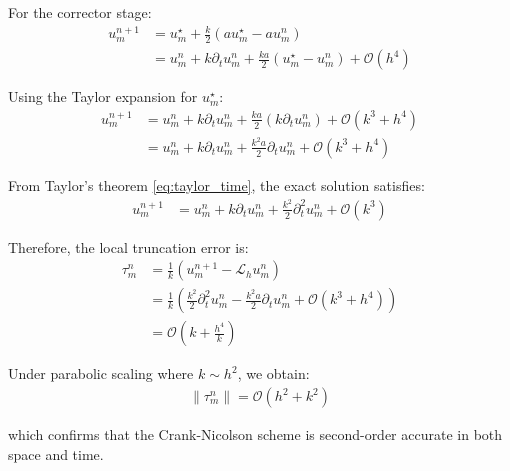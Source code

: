 For the corrector stage:
\begin{align}
  u_m^{n+1} & = u_m^\star + \frac{k}{2}(au_m^\star - au_m^n)                                    \\
            & = u_m^n + k \partial_t u_m^n + \frac{ka}{2}(u_m^\star - u_m^n) + \mathcal{O}(h^4)
\end{align}

Using the Taylor expansion for $u_m^\star$:
\begin{align}
  u_m^{n+1} & = u_m^n + k \partial_t u_m^n + \frac{ka}{2}(k \partial_t u_m^n) + \mathcal{O}(k^3 + h^4) \\
            & = u_m^n + k \partial_t u_m^n + \frac{k^2a}{2} \partial_t u_m^n + \mathcal{O}(k^3 + h^4)
\end{align}

From Taylor's theorem \eqref{eq:taylor_time}, the exact solution satisfies:
\begin{align}
  u_m^{n+1} & = u_m^n + k \partial_t u_m^n + \frac{k^2}{2}\partial_t^2 u_m^n + \mathcal{O}(k^3)
\end{align}

Therefore, the local truncation error is:
\begin{align}
  \tau_m^n & = \frac{1}{k}\left(u_m^{n+1} - \mathcal{L}_h u_m^n\right)                                                           \\
           & = \frac{1}{k}\left(\frac{k^2}{2}\partial_t^2 u_m^n - \frac{k^2a}{2}\partial_t u_m^n + \mathcal{O}(k^3 + h^4)\right) \\
           & = \mathcal{O}\left(k + \frac{h^4}{k}\right)
\end{align}

Under parabolic scaling where $k \sim h^2$, we obtain:
\begin{align}
  \|\tau_m^n\| = \mathcal{O}(h^2 + k^2)
\end{align}

which confirms that the Crank-Nicolson scheme is second-order accurate in both space and time.



